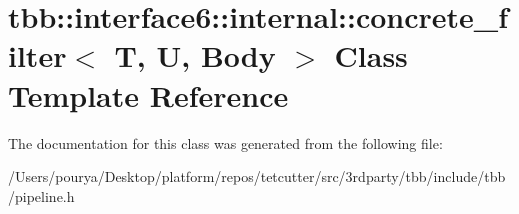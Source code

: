 \hypertarget{classtbb_1_1interface6_1_1internal_1_1concrete__filter}{}\section{tbb\+:\+:interface6\+:\+:internal\+:\+:concrete\+\_\+filter$<$ T, U, Body $>$ Class Template Reference}
\label{classtbb_1_1interface6_1_1internal_1_1concrete__filter}


The documentation for this class was generated from the following file\+:\begin{DoxyCompactItemize}
\item 
/\+Users/pourya/\+Desktop/platform/repos/tetcutter/src/3rdparty/tbb/include/tbb/pipeline.\+h\end{DoxyCompactItemize}
